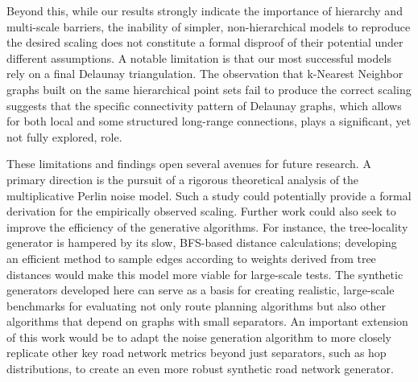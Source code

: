 Beyond this, while our results strongly indicate the importance of hierarchy and multi-scale barriers, the inability of simpler, non-hierarchical models to reproduce the desired scaling does not constitute a formal disproof of their potential under different assumptions.
A notable limitation is that our most successful models rely on a final Delaunay triangulation.
The observation that k-Nearest Neighbor graphs built on the same hierarchical point sets fail to produce the correct scaling suggests that the specific connectivity pattern of Delaunay graphs, which allows for both local and some structured long-range connections, plays a significant, yet not fully explored, role.

These limitations and findings open several avenues for future research.
A primary direction is the pursuit of a rigorous theoretical analysis of the multiplicative Perlin noise model.
Such a study could potentially provide a formal derivation for the empirically observed  scaling.
Further work could also seek to improve the efficiency of the generative algorithms.
For instance, the tree-locality generator is hampered by its slow, BFS-based distance calculations; developing an efficient method to sample edges according to weights derived from tree distances would make this model more viable for large-scale tests.
The synthetic generators developed here can serve as a basis for creating realistic, large-scale benchmarks for evaluating not only route planning algorithms but also other algorithms that depend on graphs with small separators.
An important extension of this work would be to adapt the noise generation algorithm to more closely replicate other key road network metrics beyond just separators, such as hop distributions, to create an even more robust synthetic road network generator.
